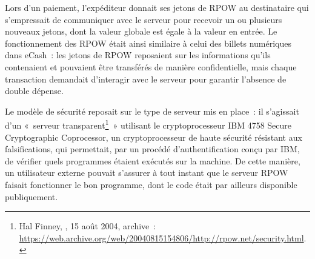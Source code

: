 Lors d'un paiement, l'expéditeur donnait ses jetons de RPOW au destinataire qui s'empressait de communiquer avec le serveur pour recevoir un ou plusieurs nouveaux jetons, dont la valeur globale est égale à la valeur en entrée. Le fonctionnement des RPOW était ainsi similaire à celui des billets numériques dans eCash~: les jetons de RPOW reposaient sur les informations qu'ils contenaient et pouvaient être transférés de manière confidentielle, mais chaque transaction demandait d'interagir avec le serveur pour garantir l'absence de double dépense.

Le modèle de sécurité reposait sur le type de serveur mis en place~: il s'agissait d'un «~serveur transparent\footnote{Hal Finney, , 15 août 2004, archive~: \url{https://web.archive.org/web/20040815154806/http://rpow.net/security.html}.}~» utilisant le cryptoprocesseur IBM 4758 Secure Cryptographic Coprocessor, un cryptoprocesseur de haute sécurité résistant aux falsifications, qui permettait, par un procédé d'authentification conçu par IBM, de vérifier quels programmes étaient exécutés sur la machine. De cette manière, un utilisateur externe pouvait s'assurer à tout instant que le serveur RPOW faisait fonctionner le bon programme, dont le code était par ailleurs disponible publiquement.

